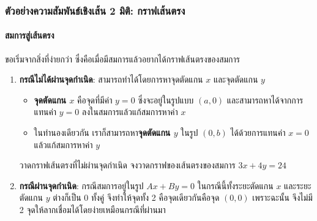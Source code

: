 \subsubsection{ตัวอย่างความสัมพันธ์เชิงเส้น 2 มิติ: กราฟเส้นตรง}
\paragraph{สมการสู่เส้นตรง}
ขอเริ่มจากสิ่งที่ง่ายกว่า ซึ่งคือเมื่อมีสมการแล้วอยากได้กราฟเส้นตรงของสมการ

\begin{enumerate}
    \item \textbf{กรณีไม่ได้ผ่านจุดกำเนิด}: สามารถทำได้โดยการหาจุดตัดแกน $x$ และจุดตัดแกน $y$
    \begin{center}
    \end{center}
    \begin{itemize}

        \item \textbf{จุดตัดแกน $x$} คือจุดที่มีค่า $y=0$ ซึ่งจะอยู่ในรูปแบบ $(a,0)$ และสามารถหาได้จากการแทนค่า $y=0$ ลงในสมการแล้วแก้สมการหาค่า $x$
        \item ในทำนองเดียวกัน เราก็สามารถหา\textbf{จุดตัดแกน $y$} ในรูป $(0,b)$ ได้ด้วยการแทนค่า $x=0$ แล้วแก้สมการหาค่า $y$
        
    \end{itemize}
    \begin{example}
        {วาดกราฟเส้นตรงที่ไม่ผ่านจุดกำเนิด}{}
        จงวาดกราฟของเส้นตรงของสมการ $3x + 4y = 24$
    \end{example}
    \newpage
    \item \textbf{กรณีผ่านจุดกำเนิด}: กรณีสมการอยู่ในรูป $Ax + By = 0$ ในกรณีนี้ทั้งระยะตัดแกน $x$ และระยะตัดแกน $y$ ต่างก็เป็น 0 ทั้งคู่ จึงทำให้จุดทั้ง 2 คือจุดเดียวกันคือจุด $(0,0)$ เพราะฉะนั้น จึงไม่มี 2 จุดให้ลากเชื่อมได้โดยง่ายเหมือนกรณีที่ผ่านมา
    \begin{center}
        \begin{tikzpicture}[scale=1.2, >=Stealth]
        

\end{tikzpicture}
\end{center}
\end{enumerate}
